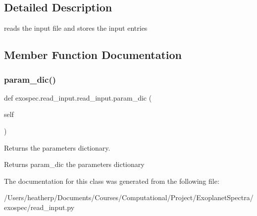 \subsection{Detailed Description}
reads the input file and stores the input entries 

\subsection{Member Function Documentation}
\mbox{\label{classexospec_1_1read__input_1_1read__input_a3b21e8723a95f914bb6c329ba68c3d86}} 
\subsubsection{\texorpdfstring{param\+\_\+dic()}{param\_dic()}}
{\footnotesize\ttfamily def exospec.\+read\+\_\+input.\+read\+\_\+input.\+param\+\_\+dic (\begin{DoxyParamCaption}\item[{}]{self }\end{DoxyParamCaption})}



Returns the parameters dictionary. 

\begin{DoxyReturn}{Returns}
param\+\_\+dic the parameters dictionary 
\end{DoxyReturn}


The documentation for this class was generated from the following file\+:\begin{DoxyCompactItemize}
\item 
/\+Users/heatherp/\+Documents/\+Courses/\+Computational/\+Project/\+Exoplanet\+Spectra/exospec/read\+\_\+input.\+py\end{DoxyCompactItemize}
